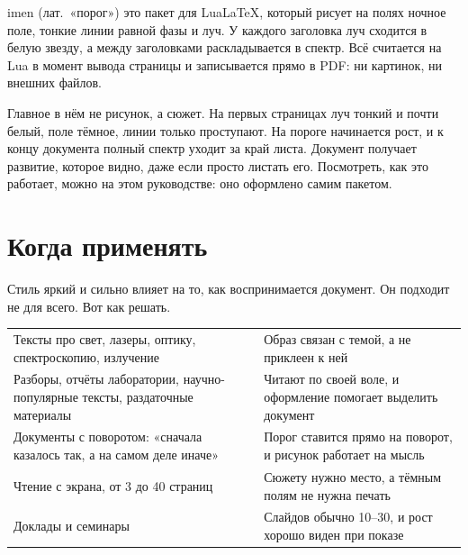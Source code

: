 \documentclass[10pt,a4paper]{article}
\begin{document}

imen (лат.\ «порог») это пакет для LuaLaTeX, который рисует на полях ночное поле, тонкие линии равной фазы и луч. У каждого заголовка луч сходится в белую звезду, а между заголовками раскладывается в спектр. Всё считается на Lua в момент вывода страницы и записывается прямо в PDF: ни картинок, ни внешних файлов.

Главное в нём не рисунок, а сюжет. На первых страницах луч тонкий и почти белый, поле тёмное, линии только проступают. На пороге начинается рост, и к концу документа полный спектр уходит за край листа. Документ получает развитие, которое видно, даже если просто листать его. Посмотреть, как это работает, можно на этом руководстве: оно оформлено самим пакетом.


\begingroup\small\setlength\parskip{0pt}\tableofcontents\endgroup

\section{Когда применять}

Стиль яркий и сильно влияет на то, как воспринимается документ. Он подходит не для всего. Вот как решать.

\medskip
\noindent\begin{tabularx}{\linewidth}{@{}P{42mm}L@{}}
\toprule
{} & \\\midrule
Тексты про свет, лазеры, оптику, спектроскопию, излучение & Образ связан с темой, а не приклеен к ней\\
Разборы, отчёты лаборатории, научно-популярные тексты, раздаточные материалы & Читают по своей воле, и оформление помогает выделить документ\\
Документы с поворотом: «сначала казалось так, а на самом деле иначе» & Порог ставится прямо на поворот, и рисунок работает на мысль\\
Чтение с экрана, от 3 до 40 страниц & Сюжету нужно место, а тёмным полям не нужна печать\\
Доклады и семинары & Слайдов обычно 10–30, и рост хорошо виден при показе\\
\bottomrule
\end{tabularx}
\end{document}
